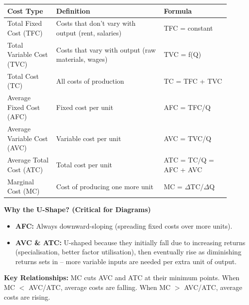 \documentclass[11pt, a4paper, twoside]{book}
\begin{document}
\begin{example}
\begin{tabular}{@{}>{\RaggedRight\arraybackslash}p{0.20\linewidth}>{\RaggedRight\arraybackslash}p{0.44\linewidth}>{\RaggedRight\arraybackslash}p{0.27\linewidth}@{}}
\textbf{Cost Type} & \textbf{Definition} & \textbf{Formula} \\
\midrule
Total Fixed Cost (TFC) & Costs that don't vary with output (rent, salaries) & TFC = constant \\
Total Variable Cost (TVC) & Costs that vary with output (raw materials, wages) & TVC = f(Q) \\
Total Cost (TC) & All costs of production & TC = TFC + TVC \\
Average Fixed Cost (AFC) & Fixed cost per unit & AFC = TFC/Q \\
Average Variable Cost (AVC) & Variable cost per unit & AVC = TVC/Q \\
Average Total Cost (ATC) & Total cost per unit & ATC = TC/Q = AFC + AVC \\
Marginal Cost (MC) & Cost of producing one more unit & MC = $\Delta$TC/$\Delta$Q \\
\end{tabular}
\end{example}

\textbf{Why the U-Shape? (Critical for Diagrams)}
\begin{itemize}
  \item \textbf{AFC:} Always downward-sloping (spreading fixed costs over more units).
  \item \textbf{AVC \& ATC:} U-shaped because they initially fall due to increasing returns (specialisation, better factor utilisation), then eventually rise as diminishing returns sets in -- more variable inputs are needed per extra unit of output.
\end{itemize}

\textbf{Key Relationships:} MC cuts AVC and ATC at their minimum points. When MC $<$ AVC/ATC, average costs are falling. When MC $>$ AVC/ATC, average costs are rising.
\end{document}
